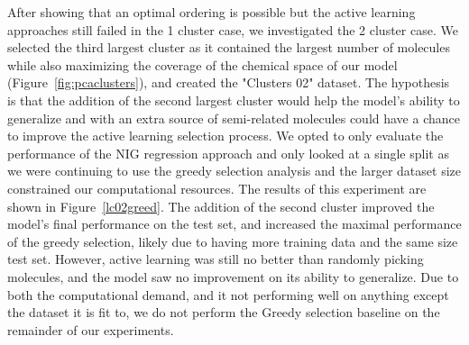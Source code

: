 \documentclass[journal=jmcmar,manuscript=article]{achemso}
\begin{document}
After showing that an optimal ordering is possible but the active learning approaches still failed in the 1 cluster case, we investigated the 2 cluster case. We selected the third largest cluster as it contained the largest number of molecules while also maximizing the coverage of the chemical space of our model (Figure~\ref{fig:pcaclusters}), and created the "Clusters 02" dataset. The hypothesis is that the addition of the second largest cluster would help the model's ability to generalize and with an extra source of semi-related molecules could have a chance to improve the active learning selection process. We opted to only evaluate the performance of the NIG regression approach and only looked at a single split as we were continuing to use the greedy selection analysis and the larger dataset size constrained our computational resources. The results of this experiment are shown in Figure~\ref{lc02greed}. The addition of the second cluster improved the model's final performance on the test set, and increased the maximal performance of the greedy selection, likely due to having more training data and the same size test set. However, active learning was still no better than randomly picking molecules, and the model saw no improvement on its ability to generalize. Due to both the computational demand, and it not performing well on anything except the dataset it is fit to, we do not perform the Greedy selection baseline on the remainder of our experiments.
\end{document}
